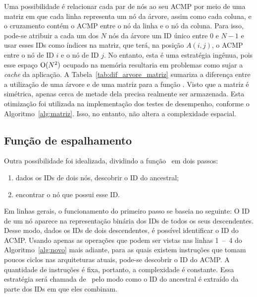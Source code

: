 Uma possibilidade é relacionar cada par de nós ao seu ACMP por meio de uma matriz
em que cada linha representa um nó da árvore, assim como cada coluna, e o cruzamento contém o ACMP entre o nó da linha e o nó da coluna.
Para isso, pode-se atribuir a cada um dos $N$ nós da árvore um ID único entre $0$ e $N-1$ e usar esses IDs como índices na matriz,
que terá, na posição $A(i,j)$, o ACMP entre o nó de ID $i$ e o nó de ID $j$.
No entanto, esta é uma estratégia ingênua, pois esse espaço $\operatorname{O}(N^2)$ ocupado na memória resultaria em problemas como sujar a \textit{cache} da aplicação.
A Tabela~\ref{tab:dif_arvore_matriz} sumariza a diferença entre a utilização de uma árvore e de uma matriz para a função \fACMP.
Visto que a matriz é simétrica, apenas cerca de metade dela precisa realmente ser armazenada.
Esta otimização foi utilizada na implementação dos testes de desempenho, conforme o Algoritmo~\ref{alg:matriz}.
Isso, no entanto, não altera a complexidade espacial.





\subsection{Função de espalhamento}

Outra possibilidade foi idealizada, dividindo a função \ACMPIDs\ em dois passos:
\begin{enumerate}
	\item dados os IDs de dois nós, descobrir o ID do ancestral;
	\item encontrar o nó que possui esse ID.
\end{enumerate}
Em linhas gerais, o funcionamento do primeiro passo se baseia no seguinte:
O ID de um nó aparece na representação binária dos IDs de todos os seus descendentes.
Desse modo, dados os IDs de dois descendentes, é possível identificar o ID do ACMP.
Usando apenas as operações que podem ser vistas nas linhas 1~--~4 do Algoritmo~\ref{alg:novo} mais adiante,
para as quais existem instruções que tomam poucos ciclos nas arquiteturas atuais, pode-se descobrir o ID do ACMP.
A quantidade de instruções é fixa, portanto, a complexidade é constante.
Essa estratégia será chamada de \Novo\ pelo modo como o ID do ancestral é extraído da parte dos IDs em que eles combinam.


